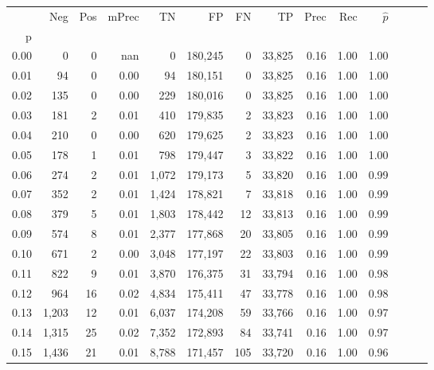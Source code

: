 \begin{tabular}{rrrrrrrrrrrrrr}
\toprule
{} &    Neg &  Pos & mPrec &       TN &       FP &      FN &      TP &  Prec &   Rec & $\hat{p}$ \\
p    &        &      &       &          &          &         &         &       &       &           \\
\midrule
0.00 &      0 &    0 &   nan &        0 &  180,245 &       0 &  33,825 &  0.16 &  1.00 &      1.00 \\
0.01 &     94 &    0 &  0.00 &       94 &  180,151 &       0 &  33,825 &  0.16 &  1.00 &      1.00 \\
0.02 &    135 &    0 &  0.00 &      229 &  180,016 &       0 &  33,825 &  0.16 &  1.00 &      1.00 \\
0.03 &    181 &    2 &  0.01 &      410 &  179,835 &       2 &  33,823 &  0.16 &  1.00 &      1.00 \\
0.04 &    210 &    0 &  0.00 &      620 &  179,625 &       2 &  33,823 &  0.16 &  1.00 &      1.00 \\
0.05 &    178 &    1 &  0.01 &      798 &  179,447 &       3 &  33,822 &  0.16 &  1.00 &      1.00 \\
0.06 &    274 &    2 &  0.01 &    1,072 &  179,173 &       5 &  33,820 &  0.16 &  1.00 &      0.99 \\
0.07 &    352 &    2 &  0.01 &    1,424 &  178,821 &       7 &  33,818 &  0.16 &  1.00 &      0.99 \\
0.08 &    379 &    5 &  0.01 &    1,803 &  178,442 &      12 &  33,813 &  0.16 &  1.00 &      0.99 \\
0.09 &    574 &    8 &  0.01 &    2,377 &  177,868 &      20 &  33,805 &  0.16 &  1.00 &      0.99 \\
0.10 &    671 &    2 &  0.00 &    3,048 &  177,197 &      22 &  33,803 &  0.16 &  1.00 &      0.99 \\
0.11 &    822 &    9 &  0.01 &    3,870 &  176,375 &      31 &  33,794 &  0.16 &  1.00 &      0.98 \\
0.12 &    964 &   16 &  0.02 &    4,834 &  175,411 &      47 &  33,778 &  0.16 &  1.00 &      0.98 \\
0.13 &  1,203 &   12 &  0.01 &    6,037 &  174,208 &      59 &  33,766 &  0.16 &  1.00 &      0.97 \\
0.14 &  1,315 &   25 &  0.02 &    7,352 &  172,893 &      84 &  33,741 &  0.16 &  1.00 &      0.97 \\
0.15 &  1,436 &   21 &  0.01 &    8,788 &  171,457 &     105 &  33,720 &  0.16 &  1.00 &      0.96 \\

\end{tabular}

